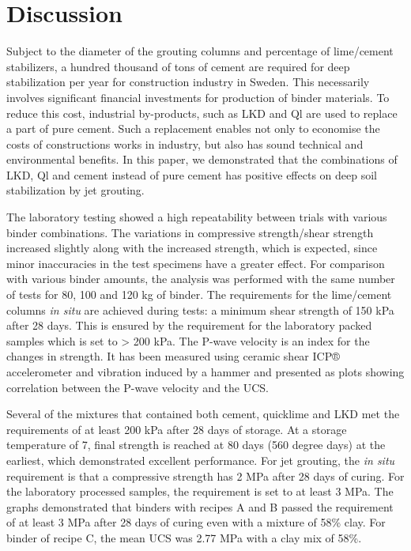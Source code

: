 \documentclass[USenglish,twocolumn]{article}
\begin{document}
\section{Discussion}
Subject to the diameter of the grouting columns and percentage of lime/cement stabilizers, a hundred thousand of tons of cement are required for deep stabilization per year for construction industry in Sweden. This necessarily involves significant financial investments for production of binder materials. To reduce this cost, industrial by-products, such as LKD and Ql are used to replace a part of pure cement. Such a replacement enables not only to economise the costs of constructions works in industry, but also has sound technical and environmental benefits. In this paper, we demonstrated that the combinations of LKD, Ql and cement instead of pure cement has positive effects on deep soil stabilization by jet grouting.

The laboratory testing showed a high repeatability between trials with various binder combinations. The variations in compressive strength/shear strength increased slightly along with the increased strength, which is expected, since minor inaccuracies in the test specimens have a greater effect. For comparison with various binder amounts, the analysis was performed with the same number of tests for 80, 100 and 120 kg of binder. The requirements for the lime/cement columns \emph{in situ} are achieved during tests: a minimum shear strength of 150 kPa after 28 days. This is ensured by the requirement for the laboratory packed samples which is set to > 200 kPa. The P-wave velocity is an index for the changes in strength. It has been measured using ceramic shear ICP® accelerometer and vibration induced by a hammer and presented as plots showing correlation between the P-wave velocity and the UCS.

Several of the mixtures that contained both cement, quicklime and LKD met the requirements of at least 200 kPa after 28 days of storage. At a storage temperature of 7\degree, final strength is reached at 80 days (560 degree days) at the earliest, which demonstrated excellent performance. For jet grouting, the \emph{in situ} requirement is that a compressive strength has 2 MPa after 28 days of curing. For the laboratory processed samples, the requirement is set to at least 3 MPa. The graphs demonstrated that binders with recipes A and B passed the requirement of at least 3 MPa after 28 days of curing even with a mixture of 58\% clay. For binder of recipe C, the mean UCS was 2.77 MPa with a clay mix of 58\%. 
\end{document}
